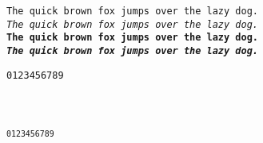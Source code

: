 \documentclass{article}
\begin{document}
\noindent
\texttt{The quick brown fox jumps over the lazy dog.} \\
\texttt{\textit{The quick brown fox jumps over the lazy dog.}} \\
\texttt{\textbf{The quick brown fox jumps over the lazy dog.}} \\
\texttt{\textbf{\textit{The quick brown fox jumps over the lazy dog.}}}

\noindent
\texttt{0123456789} \\
\texttt{} \\
\texttt{} \\
\texttt{} \\
\texttt{\textsuperscript{0123456789}}
\end{document}
